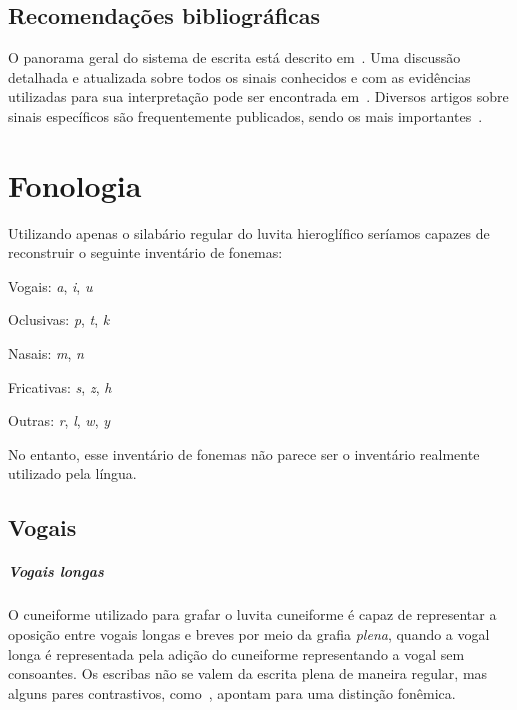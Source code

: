 \section{Recomendações bibliográficas}

O panorama geral do sistema de escrita está descrito
em~\citet[p. 155ff.]{HawkinsScripts}.
Uma discussão detalhada e atualizada sobre todos os sinais conhecidos e com
as evidências utilizadas para sua interpretação pode ser encontrada
em~\citet[354--488]{CHLI3}.
Diversos artigos sobre sinais específicos são frequentemente publicados, sendo
os mais
importantes~\citet{HawkinsMorpurgoNeumann1974,Rieken2008,RiekenYakubovich2010}.

\chapter{Fonologia}

Utilizando apenas o silabário regular do luvita hieroglífico seríamos capazes de
reconstruir o seguinte inventário de fonemas:

\begin{compactitem}
	\item Vogais: \emph{a}, \emph{i}, \emph{u}
	\item Oclusivas: \emph{p}, \emph{t}, \emph{k}
	\item Nasais: \emph{m}, \emph{n}
	\item Fricativas: \emph{s}, \emph{z}, \emph{h}
	\item Outras: \emph{r}, \emph{l}, \emph{w}, \emph{y}
\end{compactitem}
No entanto, esse inventário de fonemas não parece ser o inventário realmente
utilizado pela língua.

\section{Vogais}

\paragraph{Vogais longas}
O cuneiforme utilizado para grafar o luvita cuneiforme é capaz de representar
a oposição entre vogais longas e
breves por meio da grafia \emph{plena}, quando a vogal longa é representada pela
adição do cuneiforme representando a vogal sem consoantes.
Os escribas não se valem da escrita plena de maneira regular, mas alguns pares
contrastivos, como~\Next, apontam para uma distinção fonêmica.

